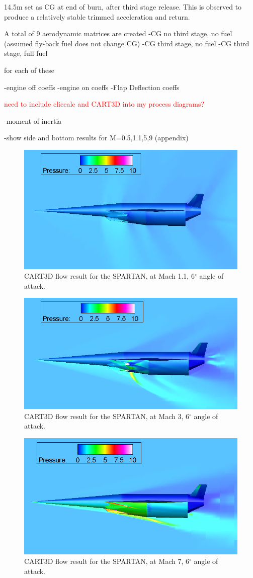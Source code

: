 14.5m set as CG at end of burn, after third stage release. This is observed to produce a relatively stable trimmed acceleration and return. 

A total of 9 aerodynamic matrices are created
-CG no third stage, no fuel (assumed fly-back fuel does not change CG)
-CG third stage, no fuel
-CG third stage, full fuel

for each of these

-engine off coeffs
-engine on coeffs
-Flap Deflection coeffs

\textcolor{red}{need to include cliccalc and CART3D into my process diagrams?}


-moment of inertia

-show side and bottom results for M=0.5,1.1,5,9 (appendix)

\begin{figure}
	\centering
	\includegraphics[width=0.7\linewidth]{figures/3_vehicle_design/M1p1AoA6}
	\caption{CART3D flow result for the SPARTAN, at Mach 1.1, 6$^\circ$ angle of attack.}
	\label{fig:M1}
\end{figure}
\begin{figure}
	\centering
	\includegraphics[width=0.7\linewidth]{figures/3_vehicle_design/M3AoA6}
	\caption{CART3D flow result for the SPARTAN, at Mach 3, 6$^\circ$ angle of attack.}
	\label{fig:M3AoA6}
\end{figure}
\begin{figure}
	\centering
	\includegraphics[width=0.7\linewidth]{figures/3_vehicle_design/M7AoA6}
	\caption{CART3D flow result for the SPARTAN, at Mach 7, 6$^\circ$ angle of attack.}
	\label{fig:M7AoA6}
\end{figure}



